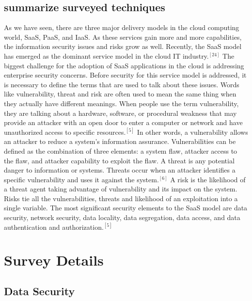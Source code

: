 \documentclass[a4paper, 8pt]{article} %
\begin{document}
\begin{doublespacing}
\subsection*{summarize surveyed techniques}

As we have seen, there are three major delivery models in the cloud computing world, SaaS, PaaS, and IaaS.  As these services gain more and more capabilities, the information security issues and risks grow as well.  Recently, the SaaS model has emerged as the dominant service model in the cloud IT industry.$^{[24]}$  The biggest challenge for the adoption of SaaS applications in the cloud is addressing enterprise security concerns.  Before security for this service model is addressed, it is necessary to define the terms that are used to talk about these issues.  Words like vulnerability, threat and risk are often used to mean the same thing when they actually have different meanings.  When people use the term vulnerability, they are talking about a hardware, software, or procedural weakness that may provide an attacker with an open door to enter a computer or network and have unauthorized access to specific resources.$^{[5]}$  In other words, a vulnerability allows an attacker to reduce a system's information assurance.  Vulnerabilities can be defined as the combination of three elements: a system flaw, attacker access to the flaw, and attacker capability to exploit the flaw.  A threat is any potential danger to information or systems.  Threats occur when an attacker identifies a specific vulnerability and uses it against the system.$^{[6]}$  A risk is the likelihood of a threat agent taking advantage of vulnerability and its impact on the system.  Risks tie all the vulnerabilities, threats and likelihood of an exploitation into a single variable.  The most significant security elements to the SaaS model are data security, network security, data locality, data segregation, data access, and data authentication and authorization.$^{[5]}$  

\section*{Survey Details}

\subsection*{Data Security}


\end{doublespacing}
\end{document}
